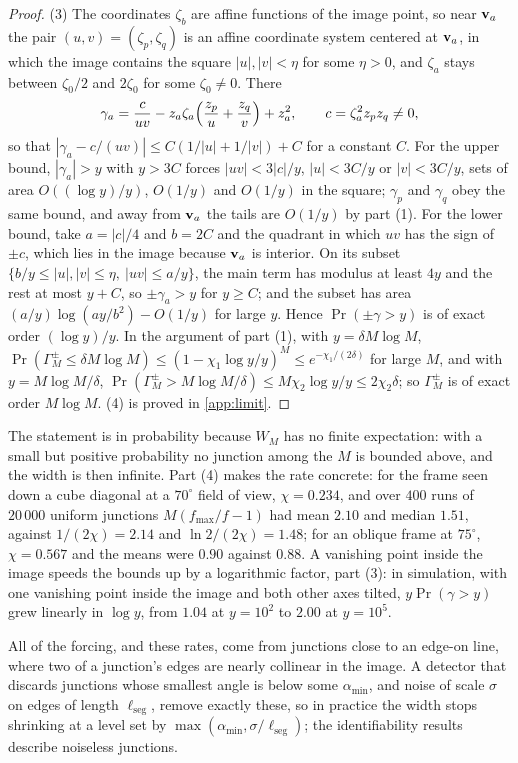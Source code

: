 \begin{proof}
(3) The coordinates $\zeta_b$ are affine functions of the image point, so near $\mathbf{v}_a$ the pair $(u,v)=(\zeta_p,\zeta_q)$ is an affine coordinate system centered at $\mathbf{v}_a$, in which the image contains the square $|u|,|v|<\eta$ for some $\eta>0$, and $\zeta_a$ stays between $\zeta_0/2$ and $2\zeta_0$ for some $\zeta_0\neq0$. There
\[
\gamma_a=\frac{c}{uv}-z_a\zeta_a\Bigl(\frac{z_p}{u}+\frac{z_q}{v}\Bigr)+z_a^2,\qquad c=\zeta_a^2z_pz_q\neq0,
\]
so that $|\gamma_a-c/(uv)|\le C(1/|u|+1/|v|)+C$ for a constant $C$. For the upper bound, $|\gamma_a|>y$ with $y>3C$ forces $|uv|<3|c|/y$, $|u|<3C/y$ or $|v|<3C/y$, sets of area $O((\log y)/y)$, $O(1/y)$ and $O(1/y)$ in the square; $\gamma_p$ and $\gamma_q$ obey the same bound, and away from $\mathbf{v}_a$ the tails are $O(1/y)$ by part (1). For the lower bound, take $a=|c|/4$ and $b=2C$ and the quadrant in which $uv$ has the sign of $\pm c$, which lies in the image because $\mathbf{v}_a$ is interior. On its subset $\{b/y\le|u|,|v|\le\eta,\ |uv|\le a/y\}$, the main term has modulus at least $4y$ and the rest at most $y+C$, so $\pm\gamma_a>y$ for $y\ge C$; and the subset has area $(a/y)\log(ay/b^2)-O(1/y)$ for large $y$. Hence $\Pr(\pm\gamma>y)$ is of exact order $(\log y)/y$. In the argument of part (1), with $y=\delta M\log M$, $\Pr(\Gamma^{\pm}_M\le\delta M\log M)\le(1-\chi_1\log y/y)^M\le e^{-\chi_1/(2\delta)}$ for large $M$, and with $y=M\log M/\delta$, $\Pr(\Gamma^{\pm}_M>M\log M/\delta)\le M\chi_2\log y/y\le2\chi_2\delta$; so $\Gamma^{\pm}_M$ is of exact order $M\log M$.
 (4) is proved in \cref{app:limit}.\end{proof}

The statement is in probability because $W_M$ has no finite expectation: with a small but positive probability no junction among the $M$ is bounded above, and the width is then infinite. Part (4) makes the rate concrete: for the frame seen down a cube diagonal at a $70^\circ$ field of view, $\chi=0.234$, and over $400$ runs of $20\,000$ uniform junctions $M(f_{\max}/f-1)$ had mean $2.10$ and median $1.51$, against $1/(2\chi)=2.14$ and $\ln2/(2\chi)=1.48$; for an oblique frame at $75^\circ$, $\chi=0.567$ and the means were $0.90$ against $0.88$. A vanishing point inside the image speeds the bounds up by a logarithmic factor, part (3): in simulation, with one vanishing point inside the image and both other axes tilted, $y\Pr(\gamma>y)$ grew linearly in $\log y$, from $1.04$ at $y=10^2$ to $2.00$ at $y=10^5$.

All of the forcing, and these rates, come from junctions close to an edge-on line, where two of a junction's edges are nearly collinear in the image. A detector that discards junctions whose smallest angle is below some $\alpha_{\min}$, and noise of scale $\sigma$ on edges of length $\ell_{\mathrm{seg}}$, remove exactly these, so in practice the width stops shrinking at a level set by $\max(\alpha_{\min},\sigma/\ell_{\mathrm{seg}})$; the identifiability results describe noiseless junctions.

